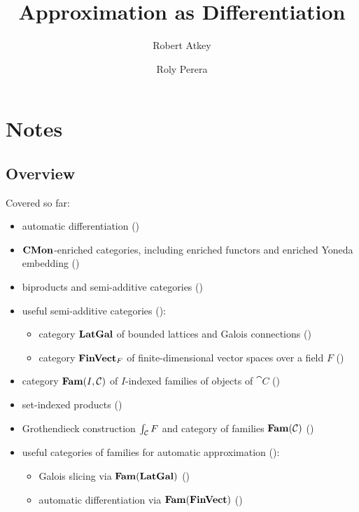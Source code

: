 \documentclass[acmsmall,screen]{acmart}
\begin{document}
\title{Approximation as Differentiation}

\author{Robert Atkey}

\author{Roly Perera}

\maketitle

\section{Notes}

\subsection{Overview}

Covered so far:
\begin{itemize}
\item automatic differentiation ()
\item $\mathbf{CMon}$-enriched categories, including enriched functors and enriched Yoneda embedding ()
\item biproducts and semi-additive categories ()
\item useful semi-additive categories ():
   \begin{itemize}
   \item category $\mathbf{LatGal}$ of bounded lattices and Galois connections ()
   \item category $\mathbf{FinVect}_F$ of finite-dimensional vector spaces over a field $F$
   ()
   \end{itemize}
\item category $\mathbf{Fam}(I,\mathcal{C})$ of $I$-indexed families of objects of $\cat{C}$ ()
\item set-indexed products ()
\item Grothendieck construction $\int_{\mathcal{C}}F$ and category of families $\mathbf{Fam}(\mathcal{C})$
()
\item useful categories of families for automatic approximation
():
   \begin{itemize}
      \item Galois slicing via $\mathbf{Fam}(\mathbf{LatGal})$ ()
      \item automatic differentiation via $\mathbf{Fam}(\mathbf{FinVect})$ ()
   \end{itemize}
\end{itemize}
\end{document}
